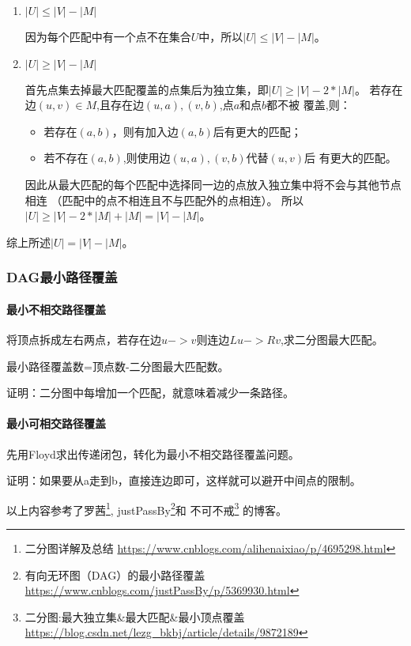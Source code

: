 \begin{enumerate}
	\item \begin{lemma}
		      $|U|\leq |V|-|M|$
          \end{lemma}
          因为每个匹配中有一个点不在集合$U$中，所以$|U|\leq |V|-|M|$。
	\item \begin{lemma}
		      $|U|\geq |V|-|M|$
          \end{lemma}
          首先点集去掉最大匹配覆盖的点集后为独立集，即$|U|\geq |V|-2*|M|$。
          若存在边$(u,v)\in M$,且存在边$(u,a),(v,b)$,点$a$和点$b$都不被
          覆盖,则：
          \begin{itemize}
              \item 若存在$(a,b)$，则有加入边$(a,b)$后有更大的匹配；
              \item 若不存在$(a,b)$,则使用边$(u,a),(v,b)$代替$(u,v)$后
              有更大的匹配。
          \end{itemize}
          因此从最大匹配的每个匹配中选择同一边的点放入独立集中将不会与其他节点相连
          （匹配中的点不相连且不与匹配外的点相连）。
          所以$|U|\geq |V|-2*|M|+|M|=|V|-|M|$。
\end{enumerate}

综上所述$|U|=|V|-|M|$。

\subsubsection{DAG最小路径覆盖}

\paragraph{最小不相交路径覆盖}

将顶点拆成左右两点，若存在边$u->v$则连边$Lu->Rv$,求二分图最大匹配。

\begin{theorem}
	最小路径覆盖数=顶点数-二分图最大匹配数。
\end{theorem}

证明：二分图中每增加一个匹配，就意味着减少一条路径。

\paragraph{最小可相交路径覆盖}

先用Floyd求出传递闭包，转化为最小不相交路径覆盖问题。

证明：如果要从a走到b，直接连边即可，这样就可以避开中间点的限制。

以上内容参考了罗茜\footnote{二分图详解及总结
	\url{https://www.cnblogs.com/alihenaixiao/p/4695298.html}},
justPassBy\footnote{有向无环图（DAG）的最小路径覆盖
	\url{https://www.cnblogs.com/justPassBy/p/5369930.html}}和
不可不戒\footnote{二分图:最大独立集\&最大匹配\&最小顶点覆盖
	\url{https://blog.csdn.net/lezg\_bkbj/article/details/9872189}}
的博客。
